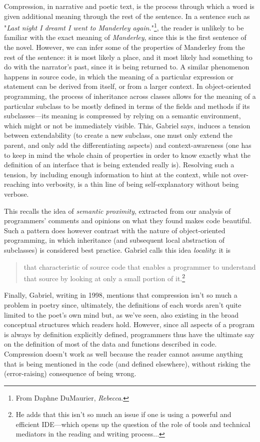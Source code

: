 \documentclass{article}
\begin{document}
Compression, in narrative and poetic text, is the process through which a word is given additional meaning through the rest of the sentence. In a sentence such as "\emph{Last night I dreamt I went to Manderley again.}"\footnote{From Daphne DuMaurier, \emph{Rebecca}.}, the reader is unlikely to be familiar with the exact meaning of \emph{Manderley}, since this is the first sentence of the novel. However, we can infer some of the properties of Manderley from the rest of the sentence: it is most likely a place, and it most likely had something to do with the narrator's past, since it is being returned to. A similar phenomenon happens in source code, in which the meaning of a particular expression or statement can be derived from itself, or from a larger context. In object-oriented programming, the process of inheritance across classes allows for the meaning of a particular subclass to be mostly defined in terms of the fields and methods if its subclasses—its meaning is compressed by relying on a semantic environment, which might or not be immediately visible. This, Gabriel says, induces a tension between extendability (to create a new subclass, one must only extend the parent, and only add the differentiating aspects) and context-awareness (one has to keep in mind the whole chain of properties in order to know exactly what the definition of an interface that is being extended really is). Resolving such a tension, by including enough information to hint at the context, while not over-reaching into verbosity, is a thin line of being self-explanatory without being verbose.

This recalls the idea of \emph{semantic proximity}, extracted from our analysis of programmers' comments and opinions on what they found makes code beautiful. Such a pattern does however contrast with the nature of object-oriented programming, in which inheritance (and subsequent local abstraction of subclasses) is considered best practice. Gabriel calls this idea \emph{locality}: it is 

\begin{quote}
  that characteristic of source code that enables a programmer to understand that source by looking at only a small portion of it.\cite{gabriel_patterns_1998}\footnote{He adds that this isn't so much an issue if one is using a powerful and efficient IDE—which opens up the question of the role of tools and technical mediators in the reading and writing process...}
\end{quote}

Finally, Gabriel, writing in 1998, mentions that compression isn't so much a problem in poetry since, ultimately, the definitions of each words aren't quite limited to the poet's own mind but, as we've seen, also existing in the broad conceptual structures which readers hold. However, since all aspects of a program is always by definition explicitly defined, programmers thus have the ultimate say on the definition of most of the data and functions described in code. Compression doesn't work as well because the reader cannot assume anything that is being mentioned in the code (and defined elsewhere), without risking the (error-raising) consequence of being wrong.
\end{document}
